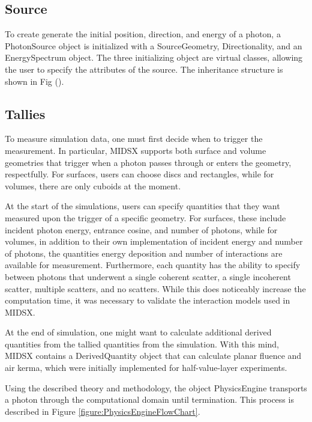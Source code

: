 \documentclass[%
 aip,
cp,  %
 amsmath,amssymb,%
reprint,%
]{revtex4-2}
\begin{document}
\subsection{Source}
    To create generate the initial position, direction, and energy of a photon, a PhotonSource object is initialized with a SourceGeometry, Directionality, and an EnergySpectrum object. The three initializing object are virtual classes, allowing the user to specify the attributes of the source. The inheritance structure is shown in Fig (). 


\subsection{Tallies}
\par To measure simulation data, one must first decide when to trigger the measurement. In particular, MIDSX supports both surface and volume geometries that trigger when a photon passes through or enters the geometry, respectfully. For surfaces, users can choose discs and rectangles, while for volumes, there are only cuboids at the moment.
\par At the start of the simulations, users can specify quantities that they want measured upon the trigger of a specific geometry. For surfaces, these include incident photon energy, entrance cosine, and number of photons, while for volumes, in addition to their own implementation of incident energy and number of photons, the quantities energy deposition and number of interactions are available for measurement. Furthermore, each quantity has the ability to specify between photons that underwent a single coherent scatter, a single incoherent scatter, multiple scatters, and no scatters. While this does noticeably increase the computation time, it was necessary to validate the interaction models used in MIDSX.
\par At the end of simulation, one might want to calculate additional derived quantities from the tallied quantities from the simulation. With this mind, MIDSX contains a DerivedQuantity object that can calculate planar fluence and air kerma, which were initially implemented for half-value-layer experiments.
\vspace{1cm}
\par Using the described theory and methodology, the object PhysicsEngine transports a photon through the computational domain until termination. This process is described in Figure \ref{figure:PhysicsEngineFlowChart}.
\end{document}
